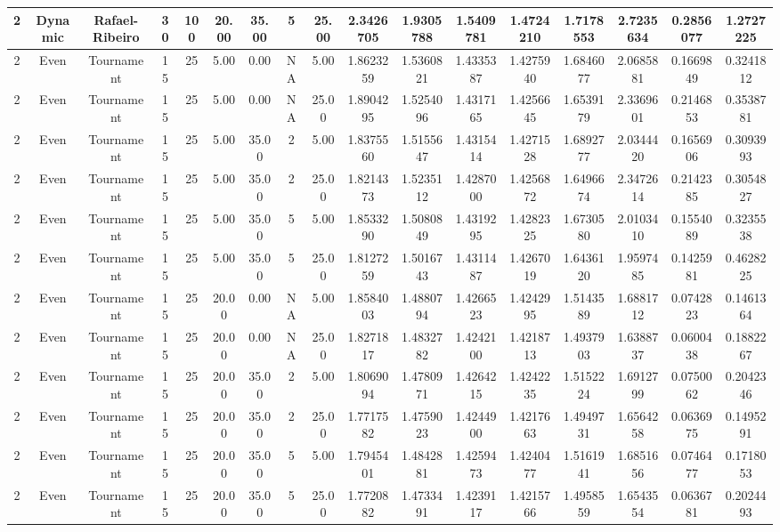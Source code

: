 \begin{longtable}{ | c | c | c | c | c | c | c | c | c | c | c | c | c | c | c | c | c | }
	\hline
	2	&	Dynamic	&	Rafael-Ribeiro	&	30	&	100	&	20.00	&	35.00	&	5	&	25.00	&	2.3426705	&	1.9305788	&	1.5409781	&	1.4724210	&	1.7178553	&	2.7235634	&	0.2856077	&	1.2727225 \\
	\hline
	2	&	Even	&	Tournament	&	15	&	25	&	5.00	&	0.00	&	NA	&	5.00	&	1.8623259	&	1.5360821	&	1.4335387	&	1.4275940	&	1.6846077	&	2.0685881	&	0.1669849	&	0.3241812 \\
	\hline
	2	&	Even	&	Tournament	&	15	&	25	&	5.00	&	0.00	&	NA	&	25.00	&	1.8904295	&	1.5254096	&	1.4317165	&	1.4256645	&	1.6539179	&	2.3369601	&	0.2146853	&	0.3538781 \\
	\hline
	2	&	Even	&	Tournament	&	15	&	25	&	5.00	&	35.00	&	2	&	5.00	&	1.8375560	&	1.5155647	&	1.4315414	&	1.4271528	&	1.6892777	&	2.0344420	&	0.1656906	&	0.3093993 \\
	\hline
	2	&	Even	&	Tournament	&	15	&	25	&	5.00	&	35.00	&	2	&	25.00	&	1.8214373	&	1.5235112	&	1.4287000	&	1.4256872	&	1.6496674	&	2.3472614	&	0.2142385	&	0.3054827 \\
	\hline
	2	&	Even	&	Tournament	&	15	&	25	&	5.00	&	35.00	&	5	&	5.00	&	1.8533290	&	1.5080849	&	1.4319295	&	1.4282325	&	1.6730580	&	2.0103410	&	0.1554089	&	0.3235538 \\
	\hline
	2	&	Even	&	Tournament	&	15	&	25	&	5.00	&	35.00	&	5	&	25.00	&	1.8127259	&	1.5016743	&	1.4311487	&	1.4267019	&	1.6436120	&	1.9597485	&	0.1425981	&	0.4628225 \\
	\hline
	2	&	Even	&	Tournament	&	15	&	25	&	20.00	&	0.00	&	NA	&	5.00	&	1.8584003	&	1.4880794	&	1.4266523	&	1.4242995	&	1.5143589	&	1.6881712	&	0.0742823	&	0.1461364 \\
	\hline
	2	&	Even	&	Tournament	&	15	&	25	&	20.00	&	0.00	&	NA	&	25.00	&	1.8271817	&	1.4832782	&	1.4242100	&	1.4218713	&	1.4937903	&	1.6388737	&	0.0600438	&	0.1882267 \\
	\hline
	2	&	Even	&	Tournament	&	15	&	25	&	20.00	&	35.00	&	2	&	5.00	&	1.8069094	&	1.4780971	&	1.4264215	&	1.4242235	&	1.5152224	&	1.6912799	&	0.0750062	&	0.2042346 \\
	\hline
	2	&	Even	&	Tournament	&	15	&	25	&	20.00	&	35.00	&	2	&	25.00	&	1.7717582	&	1.4759023	&	1.4244900	&	1.4217663	&	1.4949731	&	1.6564258	&	0.0636975	&	0.1495291 \\
	\hline
	2	&	Even	&	Tournament	&	15	&	25	&	20.00	&	35.00	&	5	&	5.00	&	1.7945401	&	1.4842881	&	1.4259473	&	1.4240477	&	1.5161941	&	1.6851656	&	0.0746477	&	0.1718053 \\
	\hline
	2	&	Even	&	Tournament	&	15	&	25	&	20.00	&	35.00	&	5	&	25.00	&	1.7720882	&	1.4733491	&	1.4239117	&	1.4215766	&	1.4958559	&	1.6543554	&	0.0636781	&	0.2024493 \\

\end{longtable}
